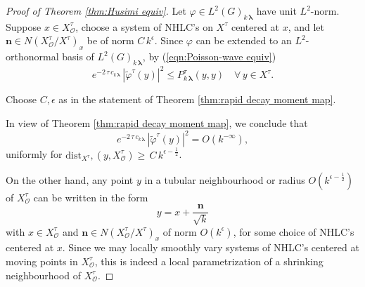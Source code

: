 \documentclass[12pt,a4paper]{article}
\theoremstyle{plain}
\theoremstyle{definition}
\begin{document}
\begin{proof}
[Proof of Theorem \ref{thm:Husimi equiv}]
Let $\varphi\in L^2(G)_{k\,\boldsymbol{\lambda}}$  
have unit $L^2$-norm. Suppose $x\in X^\tau_{\mathcal{O}}$,
choose a system of NHLC's on $X^\tau$ centered at $x$,
and let $\mathbf{n}\in N(X^\tau_{\mathcal{O}}/X^\tau)_x$ be
of norm $C\,k^{\epsilon}$. 
Since $\varphi$ can be 
extended to an $L^2$-orthonormal basis of 
$L^2(G)_{k\,\boldsymbol{\lambda}}$, by 
(\ref{eqn:Poisson-wave equiv}) 
$$
e^{-2\,\tau\,c_{k\,\boldsymbol{\lambda}}}\,\left|
\tilde{\varphi}^\tau\left( y\right)\right|^2
\le P^\tau_{k\,\boldsymbol{\lambda}} 
\left( y,y
\right)\quad \forall\,y\in X^\tau.
$$


Choose $C,\epsilon$ as in the statement of Theorem 
\ref{thm:rapid decay moment map}.

In view of Theorem \ref{thm:rapid decay moment map},
we conclude that
\begin{equation}
\label{eqn:rapid decrease single eig}
e^{-2\,\tau\,c_{k\,\boldsymbol{\lambda}}}\,\left|
\tilde{\varphi}^\tau\left( y\right)\right|^2=O\left( k^{-\infty} \right),
\end{equation}
%
uniformly for $\mathrm{dist}_{X^\tau},
\left(y,X^\tau_{\mathcal{O}}\right)
\ge \,C\,k^{\epsilon-\frac{1}{2}}$.



On the other hand, any point $y$ in a tubular neighbourhood or radius
$O\left( k^{\epsilon-\frac{1}{2}} \right)$ of $X^\tau_{\mathcal{O}}$
can be written in the form 
\begin{equation}
\label{eqn:y locl param}
y=x+\frac{\mathbf{n}}{\sqrt{k}}
\end{equation}
%
with $x\in X^\tau_{\mathcal{O}}$ and 
$\mathbf{n}\in N(X^\tau_{\mathcal{O}}/X^\tau)_x$ of norm 
$O\left(k^\epsilon\right)$, for some choice of NHLC's centered at $x$.
Since we may locally smoothly vary systems of NHLC's centered at 
moving points in $X^\tau_{\mathcal{O}}$, this is indeed 
a local parametrization
of a shrinking neighbourhood of $X^\tau_{\mathcal{O}}$.



\end{proof}
\end{document}
